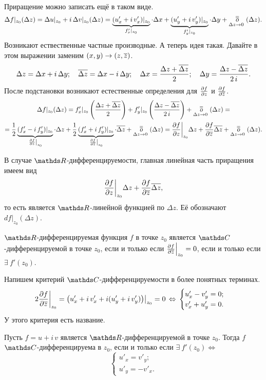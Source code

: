 Приращение можно записать ещё в таком виде.
\[
	\Delta f|_{z_0}(\Delta z) = \Delta u|_{z_0}+i\,\Delta v|_{z_0}(\Delta z) =
	\underbrace{(u'_x+i\,v'_x)|_{z_0}}_{f'_x|_{z_0}}\cdot \Delta x +
	\underbrace{(u'_y+i\,v'_y)|_{z_0}}_{f'_y|_{z_0}}\cdot \Delta y +
	\ooo{\Delta z}{\Delta z\to0}.
\]
Возникают ествественные частные производные. А теперь идея такая. Давайте в этом выражении заменим $(x,y)\to(z,\ol z)$.
\[
	\Delta z = \Delta x + i\,\Delta y;\quad 
	\ol{\Delta z} = \Delta x - i\,\Delta y;\quad 
	\Delta x = \frac{\Delta z + \ol{\Delta z}}2;\quad
	\Delta y = \frac{\Delta z - \ol{\Delta z}}{2\,i}.
\]
После подстановки возникают естественные определения для $\CP fz$ и $\CP f{\ol z}$.
\begin{multline*}
	\Delta f|_{z_0}(\Delta z) = 
	 f'_x|_{z_0}\left(\frac{\Delta z+ \ol{\Delta z}}{2}\right) + 
	 f'_y|_{z_0}\left(\frac{\Delta z- \ol{\Delta z}}{2\,i}\right) + 
	 \ooo{\Delta z}{\Delta z\to 0} =\\=
	\frac12\underbrace{(f'_x-i\,f'_y)|_{z_0}}_{\left.\CP fz\right|_{z_0}}\cdot\Delta z+
	\frac12\underbrace{(f'_x+i\,f'_y)|_{z_0}}_{\left.\CP f{\ol z}\right|_{z_0}}\cdot\ol{\Delta z} + 
	 \ooo{\Delta z}{\Delta z\to 0} =
	 \CP fz\bigg|_{z_0}\Delta z + \CP f{\ol z}\ol{\Delta z}+
	 \ooo{\Delta z}{\Delta z\to 0}.
 \end{multline*}
\begin{Def}
В случае $\R$-дифференцируемости, главная линейная часть приращения имеем вид
\[
	 \CP fz\bigg|_{z_0}\Delta z + \CP f{\ol z}\ol{\Delta z},
 \]
 то есть является $\R$-линейной функцией по $\Delta z$. Её обозначают $df|_{z_0}(\Delta z)$.
\end{Def}
\begin{Sl}
	$\R$-дифференцируемая функция $f$ в точке $z_0$ является $\C$-дифференцируемой в точке $z_0$, если и только если $\CP f{\ol z}\Big|_{z_0}=0$, если и только если $\exists\ f'(z_0)$.
\end{Sl}
Напишем критерий $\C$-дифференцируемости в более понятных терминах.
\[
	2\CP f{\ol z}\bigg|_{z_0} = \big(u'_x + i\,v'_x + i(u'_y + i\,v'_y)\big)\big|_{z_0} = 0\iff
	\begin{cases}
		u'_x - v'_y = 0;\\ v'_x+ u'_y = 0.
	\end{cases}
\]
У этого критерия есть название.
\begin{The}
	Пусть $f = u+i\,v$ является $\R$-дифференцируемой в точке $z_0$. Тогда $f$ $\C$-дифференцируема в $z_0$, если и только если $\exists\ f'(z_0)\iff$
	\[
		\begin{cases}
			u'_x = v'_y;\\ u'_y=-v'_x.
		\end{cases}
	\]
\end{The}
